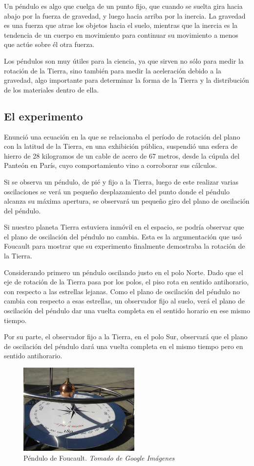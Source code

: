 \documentclass[journal]{IEEEtran}
\begin{document}
Un péndulo es algo que cuelga de un punto fijo, que cuando se suelta gira hacia abajo por la fuerza de gravedad, y luego hacia arriba por la inercia. La gravedad es una fuerza que atrae los objetos hacia el suelo, mientras que la inercia es la tendencia de un cuerpo en movimiento para continuar su movimiento a menos que actúe sobre él otra fuerza.

Los péndulos son muy útiles para la ciencia, ya que sirven no sólo para medir la rotación de la Tierra, sino también para medir la aceleración debido a la gravedad, algo importante para determinar la forma de la Tierra y la distribución de los materiales dentro de ella.

\subsection{El experimento}

Enunció una ecuación en la que se relacionaba el período de rotación del plano con la latitud de la Tierra, en una exhibición pública, suspendió una esfera de hierro de 28 kilogramos de un cable de acero de 67 metros, desde la cúpula del Panteón en París, cuyo comportamiento vino a corroborar sus cálculos.

Si se observa un péndulo, de pié y fijo a la Tierra, luego de este realizar varias oscilaciones se verá un pequeño desplazamiento del punto donde el péndulo alcanza su máxima apertura, se observará un pequeño giro del plano de oscilación del péndulo.

Si nuestro planeta Tierra estuviera inmóvil en el espacio, se podría observar que el plano de oscilación del péndulo no cambia. Esta es la argumentación que usó Foucault para mostrar que su experimento finalmente demostraba la rotación de la Tierra.

Considerando primero un péndulo oscilando justo en el polo Norte. Dado que el eje de rotación de la Tierra pasa por los polos, el piso rota en sentido antihorario, con respecto a las estrellas lejanas. Como el plano de oscilación del péndulo no cambia con respecto a esas estrellas, un observador fijo al suelo, verá el plano de oscilación del péndulo dar una vuelta completa en el sentido horario en ese mismo tiempo. 

Por su parte, el observador fijo a la Tierra, en el polo Sur, observará que el plano de oscilación del péndulo dará una vuelta completa en el mismo tiempo pero en sentido antihorario.

\begin{center}
  \begin{figure}[h!]
  \includegraphics[width=60mm]{pendulo_fourt.jpg}
  \caption{Péndulo de Foucault. \emph{Tomado de Google Imágenes}}
  \end{figure}
\end{center}
\end{document}
